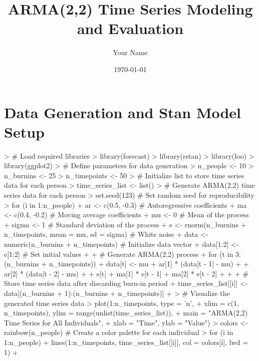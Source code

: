 \documentclass{article}
\begin{document}


\title{ARMA(2,2) Time Series Modeling and Evaluation}
\author{Your Name}
\date{\today}

\maketitle

\begin{Schunk}
\end{Schunk}

\section{Data Generation and Stan Model Setup}

\begin{Schunk}
\begin{Sinput}
> # Load required libraries
> library(forecast)
> library(rstan)
> library(loo)
> library(ggplot2)
> # Define parameters for data generation
> n_people <- 10
> n_burnins <- 25
> n_timepoints <- 50
> # Initialize list to store time series data for each person
> time_series_list <- list()
> # Generate ARMA(2,2) time series data for each person
> set.seed(123)  # Set random seed for reproducibility
> for (i in 1:n_people) {
+   ar <- c(0.5, -0.3)  # Autoregressive coefficients
+   ma <- c(0.4, -0.2)  # Moving average coefficients
+   mu <- 0             # Mean of the process
+   sigma <- 1          # Standard deviation of the process
+   e <- rnorm(n_burnins + n_timepoints, mean = mu, sd = sigma) # White noise
+   data <- numeric(n_burnins + n_timepoints) # Initialize data vector
+   data[1:2] <- e[1:2]                        # Set initial values
+   
+   # Generate ARMA(2,2) process
+   for (t in 3:(n_burnins + n_timepoints)) {
+     data[t] <- mu + ar[1] * (data[t - 1] - mu) + 
+       ar[2] * (data[t - 2] - mu) + 
+       e[t] + ma[1] * e[t - 1] + ma[2] * e[t - 2] 
+   }
+   
+   # Store time series data after discarding burn-in period
+   time_series_list[[i]] <- data[(n_burnins + 1):(n_burnins + n_timepoints)]
+ }
> # Visualize the generated time series data
> plot(1:n_timepoints, type = 'n', 
+      xlim = c(1, n_timepoints), ylim = range(unlist(time_series_list)), 
+      main = "ARMA(2,2) Time Series for All Individuals", 
+      xlab = "Time", ylab = "Value")
> colors <- rainbow(n_people)  # Create a color palette for each individual
> for (i in 1:n_people) {
+   lines(1:n_timepoints, time_series_list[[i]], col = colors[i], lwd = 1)
+ }
\end{Sinput}
\end{Schunk}
\end{document}

